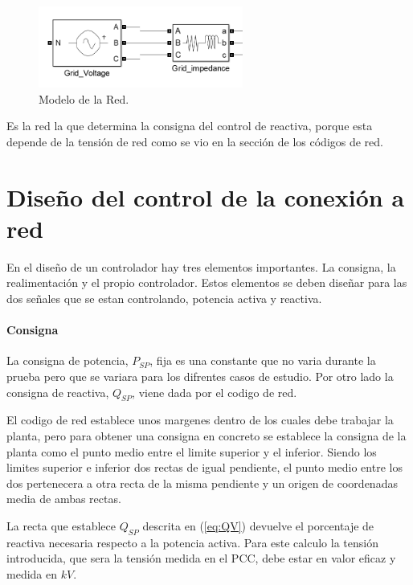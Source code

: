\documentclass{book}
\begin{document}
\begin{figure}[h!]
\centering
\includegraphics[width=0.6\textwidth]{GridSimulink.PNG}
\caption{Modelo de la Red. }
\label{GridSimulink}
\end{figure} \par

Es la red la que determina la consigna del control de reactiva, porque esta depende de la tensi\'on de red como se vio en la secci\'on de los c\'odigos de red. 


	\section{Diseño del control de la conexi\'on a red}

En el diseño de un controlador hay tres elementos importantes. La consigna, la realimentaci\'on y el propio controlador. Estos elementos se deben diseñar para las dos señales que se estan controlando, potencia activa y reactiva. \par

		\paragraph{Consigna}

La consigna de potencia, $P_{SP}$, fija es una constante que no varia durante la prueba pero que se variara para los difrentes casos de estudio. Por otro lado la consigna de reactiva, $Q_{SP}$, viene dada por el codigo de red. \par

El codigo de red establece unos margenes dentro de los cuales debe trabajar la planta, pero para obtener una consigna en concreto se establece la consigna de la planta como el punto medio entre el limite superior y el inferior. Siendo los limites superior e inferior dos rectas de igual pendiente, el punto medio entre los dos pertenecera a otra recta de la misma pendiente y un origen de coordenadas media de ambas rectas. \par

La recta que establece $Q_{SP}$ descrita en (\ref{eq:QV}) devuelve el porcentaje de reactiva necesaria respecto a la potencia activa. Para este calculo la tensi\'on introducida, que sera la tensi\'on medida en el PCC, debe estar en valor eficaz y medida en $kV$.  
\end{document}
